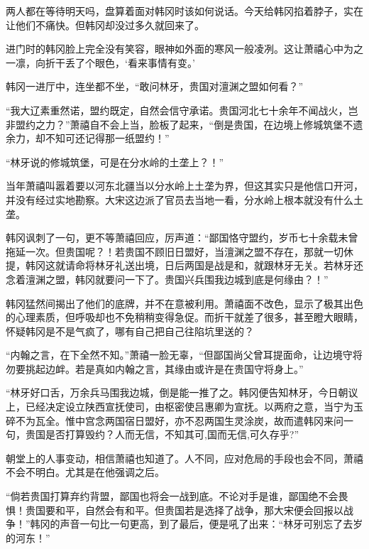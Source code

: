 两人都在等待明天吗，盘算着面对韩冈时该如何说话。今天给韩冈掐着脖子，实在让他们不痛快。但韩冈却没过多久就回来了。 

进门时的韩冈脸上完全没有笑容，眼神如外面的寒风一般凌冽。这让萧禧心中为之一凛，向折干丢了个眼色，‘看来事情有变。’ 

韩冈一进厅中，连坐都不坐，“敢问林牙，贵国对澶渊之盟如何看？” 

“我大辽素重然诺，盟约既定，自然会信守承诺。贵国河北七十余年不闻战火，岂非盟约之力？”萧禧自不会上当，脸板了起来，“倒是贵国，在边境上修城筑堡不遗余力，却不知可还记得那一纸盟约！” 

“林牙说的修城筑堡，可是在分水岭的土垄上？！” 

当年萧禧叫嚣着要以河东北疆当以分水岭上土垄为界，但这其实只是他信口开河，并没有经过实地勘察。大宋这边派了官员去当地一看，分水岭上根本就没有什么土垄。 

韩冈讽刺了一句，更不等萧禧回应，厉声道：“鄙国恪守盟约，岁币七十余载未曾拖延一次。但贵国呢？！若贵国不顾旧日盟好，当澶渊之盟不存在，那就一切休提，韩冈这就请命将林牙礼送出境，日后两国是战是和，就跟林牙无关。若林牙还念着澶渊之盟，韩冈就要问一下了。贵国兴兵围我边城到底是何缘由？！” 

韩冈猛然间揭出了他们的底牌，并不在意被利用。萧禧面不改色，显示了极其出色的心理素质，但呼吸却也不免稍稍变得急促。而折干就差了很多，甚至瞪大眼睛，怀疑韩冈是不是气疯了，哪有自己把自己往陷坑里送的？ 

“内翰之言，在下全然不知。”萧禧一脸无辜，“但鄙国尚父曾耳提面命，让边境守将勿要挑起边衅。若是真如内翰之言，其缘由或许是在贵国守将身上。” 

“林牙好口舌，万余兵马围我边城，倒是能一推了之。韩冈便告知林牙，今日朝议上，已经决定设立陕西宣抚使司，由枢密使吕惠卿为宣抚。以两府之意，当宁为玉碎不为瓦全。惟中宫念两国宿日盟好，亦不忍两国生灵涂炭，故而遣韩冈来问一句，贵国是否打算毁约？人而无信，不知其可,国而无信,可久存乎?” 

朝堂上的人事变动，相信萧禧也知道了。人不同，应对危局的手段也会不同，萧禧不会不明白。尤其是在他强调之后。 

“倘若贵国打算弃约背盟，鄙国也将会一战到底。不论对手是谁，鄙国绝不会畏惧！贵国要和平，自然会有和平。但贵国若是选择了战争，那大宋便会回报以战争！”韩冈的声音一句比一句更高，到了最后，便是吼了出来：“林牙可别忘了去岁的河东！” 
